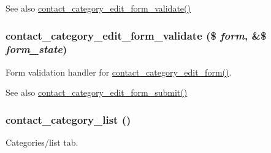 \begin{DoxySeeAlso}{See also}
\hyperlink{contact_8admin_8inc_a6d89c84e8d85557599491e121adc0faa}{contact\_\-category\_\-edit\_\-form\_\-validate()} 
\end{DoxySeeAlso}
\hypertarget{contact_8admin_8inc_a6d89c84e8d85557599491e121adc0faa}{
\subsubsection[{contact\_\-category\_\-edit\_\-form\_\-validate}]{\setlength{\rightskip}{0pt plus 5cm}contact\_\-category\_\-edit\_\-form\_\-validate (\$ {\em form}, \/  \&\$ {\em form\_\-state})}}
\label{contact_8admin_8inc_a6d89c84e8d85557599491e121adc0faa}
Form validation handler for \hyperlink{group__forms_ga9283549b12df4a9a6cdb49202ae658ac}{contact\_\-category\_\-edit\_\-form()}.

\begin{DoxySeeAlso}{See also}
\hyperlink{contact_8admin_8inc_a3bd710e3ce90722af2a776e664a0f813}{contact\_\-category\_\-edit\_\-form\_\-submit()} 
\end{DoxySeeAlso}
\hypertarget{contact_8admin_8inc_a4104e4a75baac7e93f42fec5fed43f64}{
\subsubsection[{contact\_\-category\_\-list}]{\setlength{\rightskip}{0pt plus 5cm}contact\_\-category\_\-list ()}}
\label{contact_8admin_8inc_a4104e4a75baac7e93f42fec5fed43f64}
Categories/list tab. 
